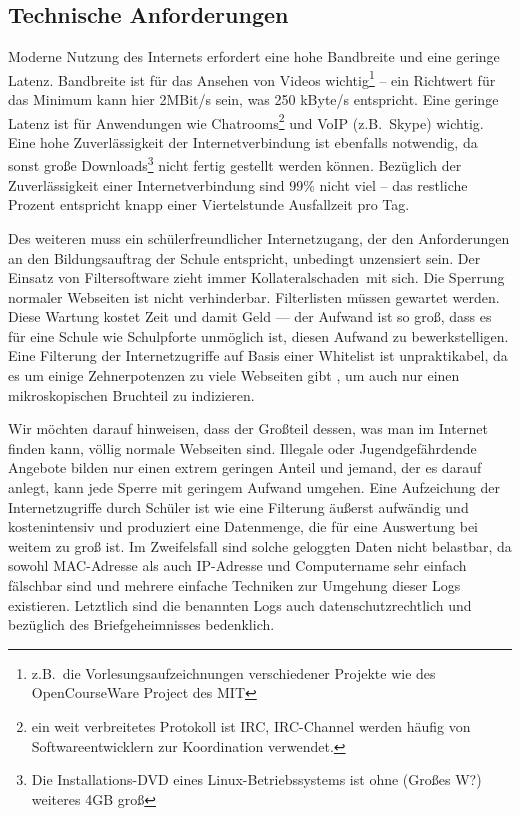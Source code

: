 \documentclass[10pt,a4paper,notitlepage]{scrartcl}
\newcommand{\gfo}{\grqq\ }
\newcommand{\gfu}{\glqq}
\newcommand{\robert}[1]{\textcolor{d-green}{#1}}
\begin{document}
\subsection{Technische Anforderungen}
\begin{multicols}{2}
Moderne Nutzung des Internets erfordert eine hohe Bandbreite und eine geringe Latenz. Bandbreite ist für das Ansehen von Videos wichtig\footnote{z.B.\ die Vorlesungsaufzeichnungen verschiedener Projekte wie des OpenCourseWare Project des MIT}	-- ein Richtwert für  das Minimum kann hier 2MBit/s sein, was 250 kByte/s entspricht. Eine geringe Latenz ist für Anwendungen wie Chatrooms\footnote{ein weit verbreitetes Protokoll ist IRC, IRC-Channel werden häufig von Softwareentwicklern zur Koordination verwendet.} und VoIP (z.B.\ Skype) wichtig. Eine hohe Zuverlässigkeit der Internetverbindung ist ebenfalls notwendig, da sonst große Downloads\footnote{Die Installations-DVD eines Linux-Betriebssystems ist ohne \robert{(Großes W?)} weiteres 4GB groß} nicht fertig gestellt werden können. Bezüglich der Zuverlässigkeit einer Internetverbindung sind 99\% nicht viel -- das restliche Prozent entspricht knapp einer Viertelstunde Ausfallzeit pro Tag.

Des weiteren muss ein schülerfreundlicher Internetzugang, der den Anforderungen an den Bildungsauftrag der Schule entspricht, unbedingt unzensiert sein. Der Einsatz von Filtersoftware zieht immer \gfu Kollateralschaden\gfo mit sich. Die Sperrung normaler Webseiten ist nicht verhinderbar.
Filterlisten müssen gewartet werden. Diese Wartung kostet Zeit und damit Geld --- der Aufwand ist so groß, dass es für eine Schule wie Schulpforte unmöglich ist, diesen Aufwand zu bewerkstelligen. Eine Filterung der Internetzugriffe auf Basis einer Whitelist ist unpraktikabel, da es um einige Zehnerpotenzen zu viele Webseiten gibt \robert{,} um auch nur einen mikroskopischen Bruchteil zu indizieren.

Wir möchten darauf hinweisen, dass der Großteil dessen, was man im Internet finden kann, völlig normale Webseiten sind. Illegale oder Jugendgefährdende Angebote bilden nur einen extrem geringen Anteil und jemand, der es darauf anlegt, kann jede Sperre mit geringem Aufwand umgehen. Eine Aufzeichung der Internetzugriffe durch Schüler ist wie eine Filterung äußerst aufwändig und kostenintensiv und produziert eine Datenmenge, die für eine Auswertung bei weitem zu groß ist. Im Zweifelsfall sind solche geloggten Daten nicht belastbar, da sowohl MAC-Adresse als auch IP-Adresse und Computername sehr einfach fälschbar sind und mehrere einfache Techniken zur Umgehung dieser Logs existieren. Letztlich sind die benannten Logs auch datenschutzrechtlich und bezüglich des Briefgeheimnisses bedenklich.


\end{multicols}
\end{document}
